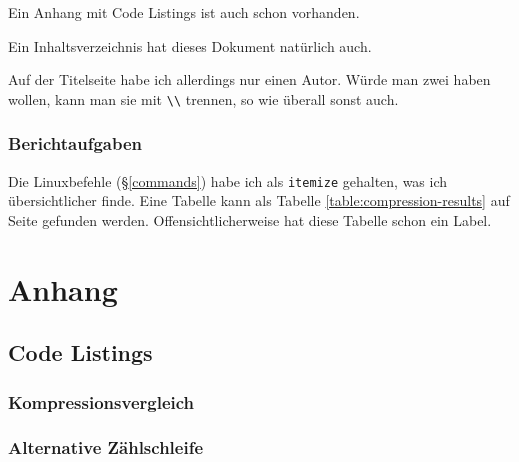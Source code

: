 \documentclass[12pt]{report}
\begin{document}
Ein Anhang mit Code Listings ist auch schon vorhanden.

Ein Inhaltsverzeichnis hat dieses Dokument natürlich auch.

Auf der Titelseite habe ich allerdings nur einen Autor. Würde man zwei haben wollen, kann man sie mit \verb#\\# trennen, so wie überall sonst auch.

\section{Berichtaufgaben}

Die Linuxbefehle (§\ref{commands}) habe ich als \texttt{itemize} gehalten, was ich übersichtlicher finde. Eine Tabelle kann als Tabelle \ref{table:compression-results} auf Seite \pageref{table:compression-results} gefunden werden. Offensichtlicherweise hat diese Tabelle schon ein Label.





\part{Anhang}
\begin{appendix}


\chapter{Code Listings}
\section{Kompressionsvergleich}
\label{listing:compression}
\lstset{language=bash}


\section{Alternative Zählschleife}
\label{listing:zahlen2}

\lstset{language=bash}

 


\end{appendix}
\end{document}
